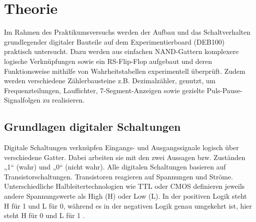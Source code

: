 \section{Theorie}
\label{sec:Theorie}
Im Rahmen des Praktikumsversuchs werden der Aufbau und das Schaltverhalten grundlegender digitaler Bauteile auf dem Experimentierboard (DEB100) praktisch untersucht. Dazu werden aus einfachen NAND-Gattern komplexere logische Verknüpfungen sowie ein RS-Flip-Flop aufgebaut und deren Funktionsweise mithilfe von Wahrheitstabellen experimentell überprüft. Zudem werden verschiedene Zählerbausteine z.B. Dezimalzähler, genutzt, um Frequenzteilungen, Lauflichter, 7-Segment-Anzeigen sowie gezielte Puls-Pause-Signalfolgen zu realisieren.\\
\subsection*{Grundlagen digitaler Schaltungen}
Digitale Schaltungen verknüpfen Eingangs- und Ausgangssignale logisch über verschiedene Gatter. Dabei arbeiten sie mit den zwei Aussagen bzw. Zuständen „1“ (wahr) und „0“ (nicht wahr). Alle digitalen Schaltungen basieren auf Transistorschaltungen. Transistoren reagieren auf Spannungen und Ströme. Unterschiedliche Halbleitertechnologien wie TTL oder CMOS definieren jeweils andere Spannungswerte als High (H) oder Low (L). In der positiven Logik steht H für 1 und L für 0, während es in der negativen Logik genau umgekehrt ist, hier steht H für 0 und L für 1 \cite{v350_anleitung}.\\
